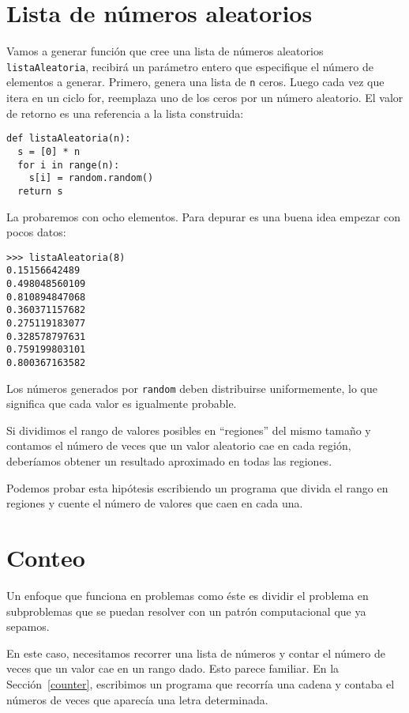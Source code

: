 \section{Lista de números aleatorios}

Vamos a generar función que cree una lista de números aleatorios \texttt{listaAleatoria},
recibirá un parámetro entero que especifique el número de elementos a generar.
Primero, genera una lista de  \texttt{n} ceros. Luego cada vez que itera 
en un ciclo for, reemplaza uno de los ceros por un número aleatorio.
El valor de retorno es una referencia a la lista construida:

\beforeverb
\begin{verbatim}
def listaAleatoria(n):
  s = [0] * n
  for i in range(n):
    s[i] = random.random()
  return s
\end{verbatim}
\afterverb
%
La probaremos con ocho elementos. Para depurar es una buena
idea empezar con pocos datos:

\beforeverb
\begin{verbatim}
>>> listaAleatoria(8)
0.15156642489
0.498048560109
0.810894847068
0.360371157682
0.275119183077
0.328578797631
0.759199803101
0.800367163582
\end{verbatim}
\afterverb
%
Los números generados por \texttt{random} deben distribuirse uniformemente,
lo que significa que cada valor es igualmente probable.

Si dividimos el rango de  valores posibles en ``regiones'' del mismo
tamaño y contamos el número de veces que un valor aleatorio cae
en cada región, deberíamos obtener un resultado aproximado en todas
las regiones.

Podemos probar esta hipótesis escribiendo un programa que
divida el rango en regiones y cuente el número de valores que caen
en cada una.


\section{Conteo}

Un enfoque que funciona en problemas como éste es dividir el problema
en subproblemas que se puedan resolver con un patrón computacional
que ya sepamos.

En este caso, necesitamos recorrer una lista de números y contar
el número de veces que un valor cae en un rango dado. Esto parece
familiar. En la Sección~\ref{counter}, escribimos un programa
que recorría una cadena y contaba el números de veces que aparecía
una letra determinada.


